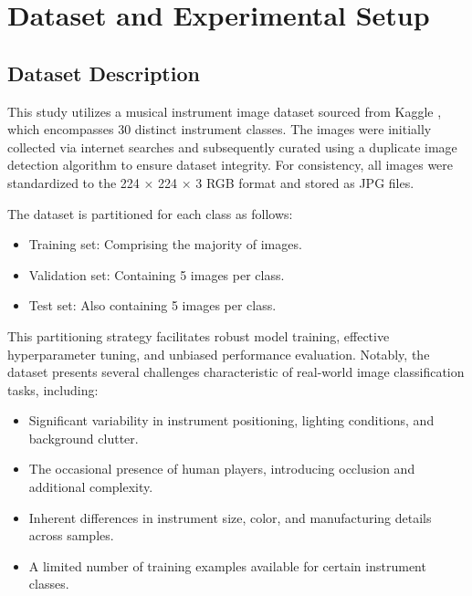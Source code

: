 
\section{Dataset and Experimental Setup}
\subsection{Dataset Description}
This study utilizes a musical instrument image dataset sourced from Kaggle \cite{gpiosenka2021}, which encompasses 30 distinct instrument classes. The images were initially collected via internet searches and subsequently curated using a duplicate image detection algorithm to ensure dataset integrity. For consistency, all images were standardized to the 224 × 224 × 3 RGB format and stored as JPG files.

The dataset is partitioned for each class as follows:
\begin{itemize}
    \item Training set: Comprising the majority of images.
    \item Validation set: Containing 5 images per class.
    \item Test set: Also containing 5 images per class.
\end{itemize}

This partitioning strategy facilitates robust model training, effective hyperparameter tuning, and unbiased performance evaluation. Notably, the dataset presents several challenges characteristic of real-world image classification tasks, including:
\begin{itemize}
    \item Significant variability in instrument positioning, lighting conditions, and background clutter.
    \item The occasional presence of human players, introducing occlusion and additional complexity.
    \item Inherent differences in instrument size, color, and manufacturing details across samples.
    \item A limited number of training examples available for certain instrument classes.
\end{itemize}


